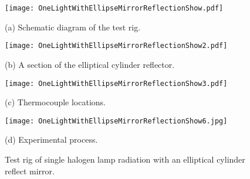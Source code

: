 \begin{figure}[ht]
  \begin{minipage}[t]{0.5\linewidth} %
  \nonumber
    \centering
    \texttt{[image: OneLightWithEllipseMirrorReflectionShow.pdf]}
    \centerline{(a) Schematic diagram of the test rig.}
    \label{Fig:OneLightWithEllipseMirrorReflectionShow}
  \end{minipage}%
  \begin{minipage}[t]{0.5\linewidth}
    \centering
    \texttt{[image: OneLightWithEllipseMirrorReflectionShow2.pdf]}
    \centerline{(b) A section of the elliptical cylinder reflector.}
    \label{Fig:OneLightWithEllipseMirrorReflectionShow2}
  \end{minipage}

  \begin{minipage}[t]{0.5\linewidth} %
  \nonumber
    \centering
    \texttt{[image: OneLightWithEllipseMirrorReflectionShow3.pdf]}
    \centerline{(c) Thermocouple locations.}
    \label{Fig:OneLightWithEllipseMirrorReflectionShow3}
  \end{minipage}%
  \begin{minipage}[t]{0.5\linewidth}
    \centering
    \texttt{[image: OneLightWithEllipseMirrorReflectionShow6.jpg]}
    \centerline{(d) Experimental process.}
    \label{Fig:OneLightWithEllipseMirrorReflectionShow6}
  \end{minipage}


  \caption{Test rig of single halogen lamp radiation with an elliptical cylinder reflect mirror.}
  \label{Fig:OneLightWithEllipseMirrorReflectionShow}
\end{figure}

